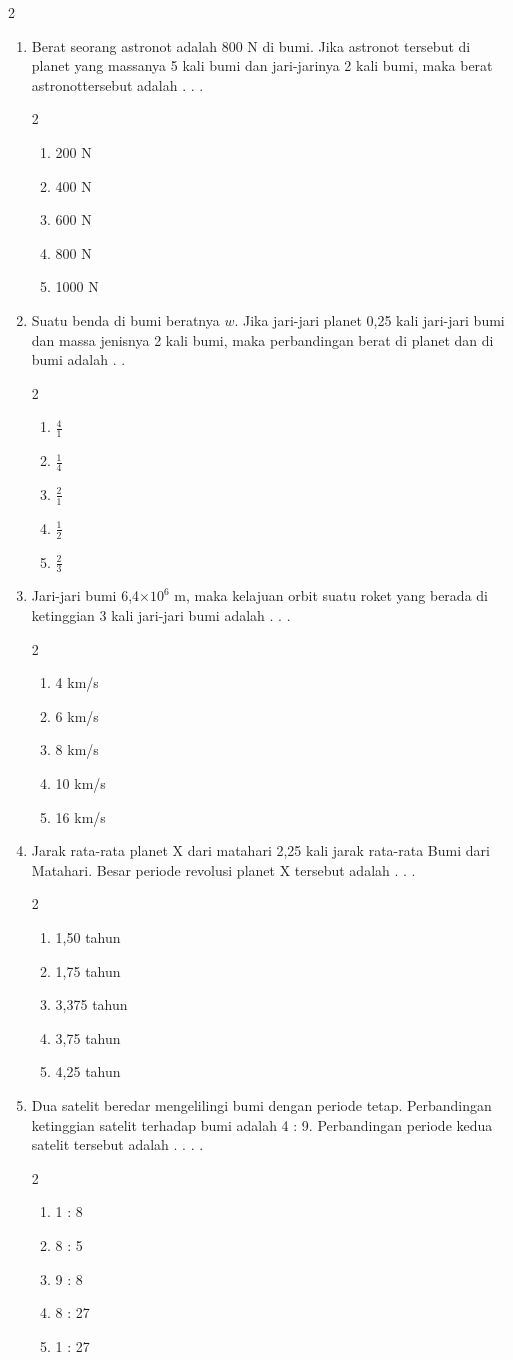 \documentclass[10pt,a4paper]{article}
\newcommand{\pilgani}[1]{                            \vspace{-0.3cm}\begin{multicols}{2}
 \begin{enumerate}[label=\Alph*., itemsep=0pt,topsep=0pt,leftmargin=*,align=Center]#1                     \end{enumerate}
 \phantom{ini cuma sapi, wedus, dan ayam}
 \end{multicols}}
\begin{document}
\begin{multicols*}{2}
\begin{enumerate}
\item Berat seorang astronot adalah 800 N di bumi. Jika astronot tersebut di planet yang massanya 5 kali bumi dan jari-jarinya 2 kali bumi, maka berat astronottersebut adalah . . . 
\pilgani{
    \item 200 N
    \item 400 N
    \item 600 N
    \item 800 N
    \item 1000 N
}
\vspace{3cm}

\item Suatu benda di bumi beratnya $w$. Jika jari-jari planet 0,25 kali jari-jari bumi dan massa jenisnya 2 kali bumi, maka perbandingan berat di planet dan di bumi adalah . . 
\pilgani{
    \item $\frac{4}{1}$
    \item $\frac{1}{4}$
    \item $\frac{2}{1}$
    \item $\frac{1}{2}$
    \item $\frac{2}{3}$
}
\vspace{3cm}

\item Jari-jari bumi 6,4$\times 10^6$ m, maka kelajuan orbit suatu roket yang berada di ketinggian 3 kali jari-jari bumi adalah . . . 
\pilgani {
    \item 4 km/s
    \item 6 km/s
    \item 8 km/s
    \item 10 km/s
    \item 16 km/s
}
\vspace{3cm}

\item Jarak rata-rata planet X dari matahari 2,25 kali jarak rata-rata Bumi dari Matahari. Besar periode revolusi planet X tersebut adalah . . . 
\pilgani{
    \item 1,50 tahun
    \item 1,75 tahun
    \item 3,375 tahun
    \item 3,75 tahun
    \item 4,25 tahun
}
\vspace{3cm}

\item Dua satelit beredar mengelilingi bumi dengan periode tetap. Perbandingan ketinggian satelit terhadap bumi adalah 4 : 9. Perbandingan periode kedua satelit tersebut adalah . . . .
\pilgani{
    \item 1 : 8
    \item 8 : 5
    \item 9 : 8
    \item 8 : 27
    \item 1 : 27
}
\vspace{3cm}



\end{enumerate}
\end{multicols*}
\end{document}
